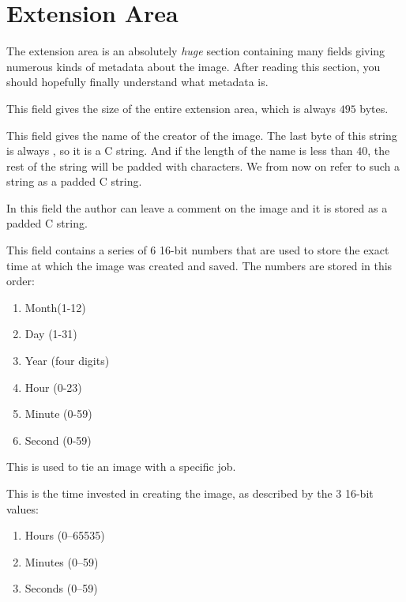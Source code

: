 \section{Extension Area}
\label{sec:tga-extension-area}

The extension area is an absolutely \textit{huge} section containing
many fields giving numerous kinds of metadata about the image. After
reading this section, you should hopefully finally understand what
metadata is.


This field gives the size of the entire extension area, which is
always $495$ bytes.


This field gives the name of the creator of the image. The last byte
of this string is always \nullm, so it is a C string. And if the
length of the name is less than $40$, the rest of the string will be
padded with \nullm characters. We from now on refer to such a string
as a \nullm padded C string.


In this field the author can leave a comment on the image and it is
stored as a \nullm padded C string.


This field contains a series of 6 16-bit numbers that are used to
store the exact time at which the image was created and saved. The
numbers are stored in this order:

\begin{enumerate}
\item Month(1-12)
\item Day (1-31)
\item Year (four digits)
\item Hour (0-23)
\item Minute (0-59)
\item Second (0-59)
\end{enumerate}


This is used to tie an image with a specific job.


This is the time invested in creating the image, as described by the 3
16-bit values:

\begin{enumerate}
\item Hours (0--65535)
\item Minutes (0--59)
\item Seconds (0--59)
\end{enumerate}

